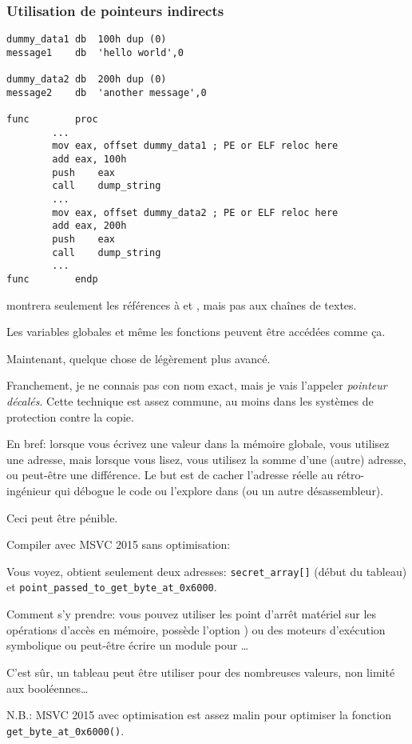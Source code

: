 \subsubsection{Utilisation de pointeurs indirects}

\begin{lstlisting}[style=customasmx86]
dummy_data1	db	100h dup (0)
message1	db	'hello world',0

dummy_data2	db	200h dup (0)
message2	db	'another message',0

func		proc
		...
		mov	eax, offset dummy_data1 ; PE or ELF reloc here
		add	eax, 100h
		push	eax
		call	dump_string
		...
		mov	eax, offset dummy_data2 ; PE or ELF reloc here
		add	eax, 200h
		push	eax
		call	dump_string
		...
func		endp
\end{lstlisting}

\IDA{} montrera seulement les références à  et ,
mais pas aux chaînes de textes.

Les variables globales et même les fonctions peuvent être accédées comme ça.

Maintenant, quelque chose de légèrement plus avancé.

Franchement, je ne connais pas con nom exact, mais je vais l'appeler \textit{pointeur décalés}.
Cette technique est assez commune, au moins dans les systèmes de protection contre
la copie.

En bref: lorsque vous écrivez une valeur dans la mémoire globale, vous utilisez
une adresse, mais lorsque vous lisez, vous utilisez la somme d'une (autre) adresse,
ou peut-être une différence.
Le but est de cacher l'adresse réelle au rétro-ingénieur qui débogue le code ou
l'explore dans \IDA (ou un autre désassembleur).

Ceci peut être pénible.



Compiler avec MSVC 2015 sans optimisation:



Vous voyez, \IDA obtient seulement deux adresses: \verb|secret_array[]| (début du
tableau) et \verb|point_passed_to_get_byte_at_0x6000|.

Comment s'y prendre: vous pouvez utiliser les point d'arrêt matériel sur les opérations
d'accès en mémoire, \tracer possède l'option ) ou des moteurs d'exécution
symbolique ou peut-être écrire un module pour \IDA\dots

C'est sûr, un tableau peut être utiliser pour des nombreuses valeurs, non limité
aux booléennes\dots

N.B.: MSVC 2015 avec optimisation est assez malin pour optimiser la fonction\\
\verb|get_byte_at_0x6000()|.

